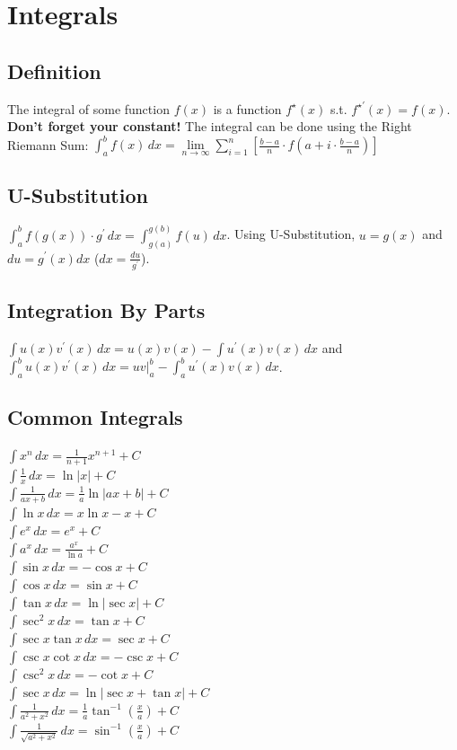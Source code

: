 \documentclass[10pt,landscape,letterpaper]{cheatsheet}
\begin{document}
\section*{Integrals}

\subsection*{Definition}
The integral of some function $f(x)$ is a function $f^{\star}(x)$ s.t. $f^{\star\prime}(x)=f(x)$. \textbf{Don't forget your constant!}
The integral can be done using the Right Riemann Sum:
$\int_{a}^{b} f(x) \,dx = \lim\limits_{n\to \infty}\sum_{i=1}^{n}\left[\frac{b-a}{n}\cdot f(a+i\cdot\frac{b-a}{n})\right]$

\subsection*{U-Substitution}
$ \int_{a}^{b} f(g(x)) \cdot g^{\prime} \,dx = \int_{g(a)}^{g(b)} f(u) \,dx $. Using U-Substitution, $u=g(x)$ and $du=g^{\prime}(x)dx$ ($dx=\frac{du}{g^{\prime}}$).

\subsection*{Integration By Parts}
$\int u(x)v^{\prime}(x) \,dx = u(x)v(x) - \int u^{\prime}(x)v(x) \,dx $ and $ \int_{a}^{b} u(x)v^{\prime}(x) \,dx = uv\vert_{a}^{b} - \int_{a}^{b} u^{\prime}(x)v(x) \,dx$.

\subsection*{Common Integrals}
$ \int x^n \,dx = \frac{1}{n+1}x^{n+1} + C $ \\
$ \int \frac{1}{x} \,dx = \ln{\left\lvert x \right\rvert} + C $ \\
$ \int \frac{1}{ax+b} \,dx = \frac{1}{a} \ln{\left\lvert ax+b \right\rvert } + C $ \\
$ \int \ln{x} \,dx = x\ln{x} - x + C $ \\
$ \int e^x \,dx = e^x + C $ \\
$ \int a^x \,dx = \frac{a^x}{\ln{a}} + C $ \\
$ \int \sin{x} \,dx = -\cos{x} + C $ \\
$ \int \cos{x} \,dx = \sin{x} + C $ \\
$ \int \tan{x} \,dx = \ln{\left\lvert \sec{x} \right\rvert} + C $ \\
$ \int \sec^2{x} \,dx = \tan{x} + C $ \\
$ \int \sec{x}\tan{x} \,dx = \sec{x} + C $ \\
$ \int \csc{x}\cot{x} \,dx = -\csc{x} + C $ \\
$ \int \csc^2{x} \,dx = -\cot{x} + C $ \\
$ \int \sec{x} \,dx = \ln{\left\lvert \sec{x} + \tan{x} \right\rvert} + C $ \\
$ \int \frac{1}{a^2+x^2} \,dx = \frac{1}{a}\tan^{-1}\left({\frac{x}{a}}\right) + C $ \\
$ \int \frac{1}{\sqrt{a^2+x^2}} \,dx = \sin^{-1}\left({\frac{x}{a}}\right) + C $ \\
\end{document}
